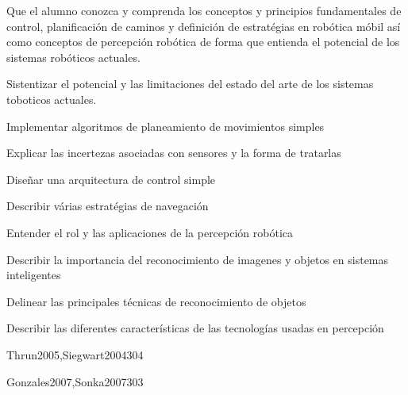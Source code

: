 \begin{syllabus}


\begin{justification}
Que el alumno conozca y comprenda los conceptos y principios fundamentales de control, planificación de caminos 
y definición de estratégias en robótica móbil así como conceptos de percepción robótica de forma que entienda 
el potencial de los sistemas robóticos actuales.
\end{justification}

\begin{goals}
\item Sistentizar el potencial y las limitaciones del estado del arte de los sistemas toboticos actuales.
\item Implementar algoritmos de planeamiento de movimientos simples
\item Explicar las incertezas asociadas con sensores y la forma de tratarlas
\item Diseñar una arquitectura de control simple
\item Describir várias estratégias de navegación
\item Entender el rol y las aplicaciones de la percepción robótica
\item Describir la importancia del reconocimiento de imagenes y objetos en sistemas inteligentes
\item Delinear las principales técnicas de reconocimiento de objetos
\item Describir las diferentes características de las tecnologías usadas en percepción
\end{goals}

\begin{outcomes}
\end{outcomes}

\begin{unit}{\ISRoboticsDef}{Thrun2005,Siegwart2004}{30}{4}
   \ISRoboticsAllTopics
   \ISRoboticsAllObjectives
\end{unit}

\begin{unit}{\ISPerceptionDef}{Gonzales2007,Sonka2007}{30}{3}
   \ISPerceptionAllTopics
   \ISPerceptionAllObjectives
\end{unit}



\begin{coursebibliography}
\end{coursebibliography}

\end{syllabus}
